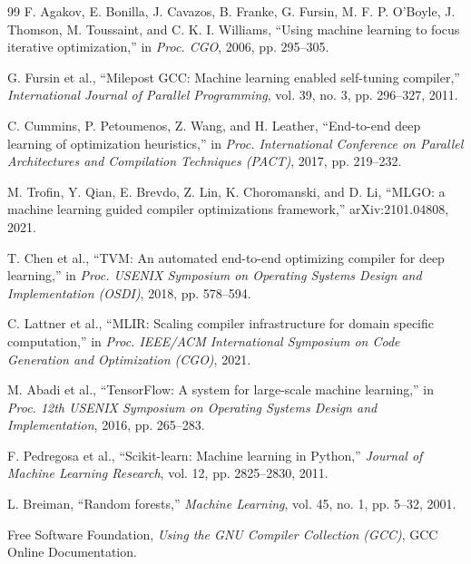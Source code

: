 \documentclass[12pt,a4paper]{article}
\begin{document}
\begin{thebibliography}{99}
F. Agakov, E. Bonilla, J. Cavazos, B. Franke, G. Fursin, M. F. P. O'Boyle,
J. Thomson, M. Toussaint, and C. K. I. Williams,
``Using machine learning to focus iterative optimization,''
in \textit{Proc. CGO}, 2006, pp. 295--305.

G. Fursin et al.,
``Milepost GCC: Machine learning enabled self-tuning compiler,''
\textit{International Journal of Parallel Programming}, vol. 39, no. 3,
pp. 296--327, 2011.

C. Cummins, P. Petoumenos, Z. Wang, and H. Leather,
``End-to-end deep learning of optimization heuristics,''
in \textit{Proc. International Conference on Parallel Architectures and
Compilation Techniques (PACT)}, 2017, pp. 219--232.

M. Trofin, Y. Qian, E. Brevdo, Z. Lin, K. Choromanski, and D. Li,
``MLGO: a machine learning guided compiler optimizations framework,''
arXiv:2101.04808, 2021.

T. Chen et al.,
``TVM: An automated end-to-end optimizing compiler for deep learning,''
in \textit{Proc. USENIX Symposium on Operating Systems Design and
Implementation (OSDI)}, 2018, pp. 578--594.

C. Lattner et al.,
``MLIR: Scaling compiler infrastructure for domain specific computation,''
in \textit{Proc. IEEE/ACM International Symposium on Code Generation and
Optimization (CGO)}, 2021.

M. Abadi et al.,
``TensorFlow: A system for large-scale machine learning,''
in \textit{Proc. 12th USENIX Symposium on Operating Systems Design and
Implementation}, 2016, pp. 265--283.

F. Pedregosa et al.,
``Scikit-learn: Machine learning in Python,''
\textit{Journal of Machine Learning Research}, vol. 12, pp. 2825--2830, 2011.

L. Breiman,
``Random forests,''
\textit{Machine Learning}, vol. 45, no. 1, pp. 5--32, 2001.

Free Software Foundation,
\textit{Using the GNU Compiler Collection (GCC)},
GCC Online Documentation.

\end{thebibliography}
\end{document}
